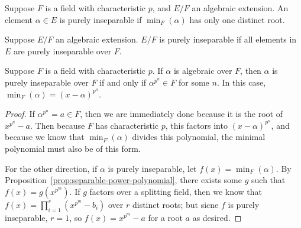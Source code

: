 \begin{definition}
    Suppose \(F\) is a field with characteristic \(p\),
    and \(E/F\) an algebraic extension.
    An element \(\alpha \in E\) is purely inseparable
    if \(\min_F(\alpha)\) has only one distinct root.
\end{definition}
\begin{definition}
    Suppose \(E/F\) an algebraic extension.
    \(E/F\) is purely inseparable
    if all elements in \(E\) are purely inseparable over \(F\).
\end{definition}
\begin{lemma}\label{lem:purely-inseparable-power}
    Suppose \(F\) is a field with characteristic \(p\).
    If \(\alpha\) is algebraic over \(F\),
    then \(\alpha\) is purely inseparable over \(F\)
    if and only if \(\alpha^{p^n} \in F\) for some \(n\).
    In this case, \(\min_F(\alpha) = {(x-\alpha)}^{p^n}\).
\end{lemma}
\begin{proof}
    If \(\alpha^{p^n} = a \in F\), then we are immediately done because it is the root of \(x^{p^n} - a\).
    Then because \(F\) has characteristic \(p\), this factors into \({(x-\alpha)}^{p^n}\),
    and because we know that \(\min_F(\alpha)\) divides this polynomial,
    the minimal polynomial must also be of this form.

    For the other direction, if \(\alpha\) is purely inseparable, let \(f(x) = \min_F(\alpha)\).
    By Proposition~\ref{prop:separable-power-polynomial},
    there exists some \(g\) such that \(f(x) = g(x^{p^m})\).
    If \(g\) factors over a splitting field,
    then we know that \(f(x) = \prod_{i=1}^r (x^{p^m} - b_i)\) over \(r\) distinct roots;
    but sicne \(f\) is purely inseparable, \(r = 1\),
    so \(f(x) = x^{p^m} - a\) for a root \(a\) as desired.
\end{proof}

